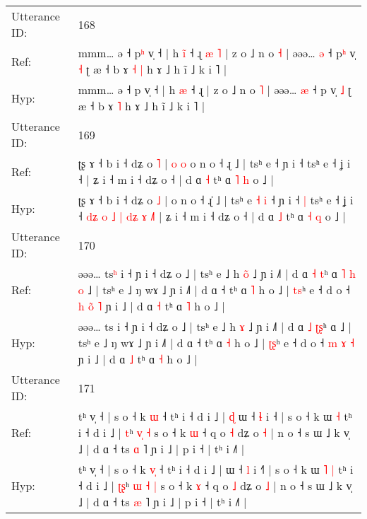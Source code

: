 \documentclass[10pt]{article}
\DeclareRobustCommand{\hl}[1]{{\textcolor{red}{#1}}}
\begin{document}
\begin{longtable}{ll}
 \\
\midrule
Utterance ID: & 168 \\
Ref: & mmm… ə ˧ p\hl{ʰ} v̩ ˧ | h \hl{i}\hl{̃} ˧ ɻ\hl{ }\hl{æ}\hl{ }\hl{˥} | z o ˩ n o \hl{˧} | əəə… \hl{ə} ˧ p\hl{ʰ} v̩ \hl{˧} ʈ æ ˧ b ɤ\hl{ }\hl{˧} \hl{|} h ɤ ˩ h ĩ ˩ k i ˥ |
 \\
Hyp: & mmm… ə ˧ p\hl{} v̩ ˧ | h \hl{}\hl{æ} ˧ ɻ\hl{}\hl{}\hl{}\hl{} | z o ˩ n o \hl{˥} | əəə… \hl{æ} ˧ p\hl{} v̩ \hl{˩} ʈ æ ˧ b ɤ\hl{}\hl{} \hl{˥} h ɤ ˩ h ĩ ˩ k i ˥ |
 \\
\midrule
Utterance ID: & 169 \\
Ref: & ʈʂ ɤ ˧ b i ˧ dʑ o \hl{˥} |\hl{ }\hl{o}\hl{ }\hl{o} o n o ˧ ɻ\hl{} ˩ | tsʰ e\hl{}\hl{}\hl{}\hl{} ˧ ɲ i ˧\hl{}\hl{} tsʰ e ˧ ʝ i ˧\hl{}\hl{}\hl{}\hl{}\hl{}\hl{}\hl{}\hl{}\hl{}\hl{}\hl{}\hl{}\hl{}\hl{}\hl{}\hl{}\hl{} | ʑ i ˧ m i ˧ dʑ o ˧ | d ɑ \hl{˧} tʰ ɑ \hl{˥} \hl{h} o ˩ |
 \\
Hyp: & ʈʂ ɤ ˧ b i ˧ dʑ o \hl{˩} |\hl{}\hl{}\hl{}\hl{} o n o ˧ ɻ\hl{̍} ˩ | tsʰ e\hl{ }\hl{˧}\hl{ }\hl{i} ˧ ɲ i ˧\hl{ }\hl{|} tsʰ e ˧ ʝ i ˧\hl{ }\hl{d}\hl{ʑ}\hl{ }\hl{o}\hl{ }\hl{˩}\hl{ }\hl{|}\hl{ }\hl{d}\hl{ʑ}\hl{ }\hl{ɤ}\hl{ }\hl{˩}\hl{˥} | ʑ i ˧ m i ˧ dʑ o ˧ | d ɑ \hl{˩} tʰ ɑ \hl{˧} \hl{q} o ˩ |
 \\
\midrule
Utterance ID: & 170 \\
Ref: & əəə… ts\hl{ʰ} i ˧ ɲ i ˧ dʑ o ˩ | tsʰ e ˩ h \hl{o}\hl{̃} ˩ ɲ i ˩˥ | d ɑ \hl{˧} \hl{}\hl{t}ʰ ɑ\hl{ }\hl{˥}\hl{ }\hl{h}\hl{ }\hl{o} ˩ | tsʰ e ˩ ŋ wɤ ˩ ɲ i ˩˥ | d ɑ ˧ tʰ ɑ \hl{˥} h o ˩ | \hl{t}\hl{s}ʰ e ˧ d o ˧ \hl{h} \hl{o}\hl{̃} \hl{˥} ɲ i ˩ | d ɑ \hl{˧} tʰ ɑ \hl{˥} h o ˩ |
 \\
Hyp: & əəə… ts\hl{} i ˧ ɲ i ˧ dʑ o ˩ | tsʰ e ˩ h \hl{}\hl{ɤ} ˩ ɲ i ˩˥ | d ɑ \hl{˩} \hl{ʈ}\hl{ʂ}ʰ ɑ\hl{}\hl{}\hl{}\hl{}\hl{}\hl{} ˩ | tsʰ e ˩ ŋ wɤ ˩ ɲ i ˩˥ | d ɑ ˧ tʰ ɑ \hl{˧} h o ˩ | \hl{ʈ}\hl{ʂ}ʰ e ˧ d o ˧ \hl{m} \hl{}\hl{ɤ} \hl{˧} ɲ i ˩ | d ɑ \hl{˩} tʰ ɑ \hl{˧} h o ˩ |
 \\
\midrule
Utterance ID: & 171 \\
Ref: & tʰ v̩ ˧ | s o ˧ k \hl{}\hl{ɯ} ˧ tʰ i ˧ d i ˩ |\hl{ }\hl{ɖ} ɯ ˧ \hl{ɬ} i ˧\hl{} | s o ˧ k ɯ\hl{}\hl{} \hl{˧} tʰ i ˧ d i ˩ | \hl{}\hl{t}ʰ \hl{}\hl{v}\hl{̩} \hl{˧} s o ˧ k \hl{ɯ} ˧ q o \hl{˧} dʑ o \hl{˧} | n o ˧ s ɯ ˩ k v̩ ˩ | d ɑ ˧ ts \hl{ɑ} ˥ ɲ i ˩ | p i ˧ | tʰ i ˩˥ |
 \\
Hyp: & tʰ v̩ ˧ | s o ˧ k \hl{v}\hl{̩} ˧ tʰ i ˧ d i ˩ |\hl{}\hl{} ɯ ˧ \hl{l} i ˧\hl{˥} | s o ˧ k ɯ\hl{ }\hl{˥} \hl{|} tʰ i ˧ d i ˩ | \hl{ʈ}\hl{ʂ}ʰ \hl{ɯ}\hl{ }\hl{˧} \hl{|} s o ˧ k \hl{ɤ} ˧ q o \hl{˩} dʑ o \hl{˩} | n o ˧ s ɯ ˩ k v̩ ˩ | d ɑ ˧ ts \hl{æ} ˥ ɲ i ˩ | p i ˧ | tʰ i ˩˥ |

\end{longtable}
\end{document}
